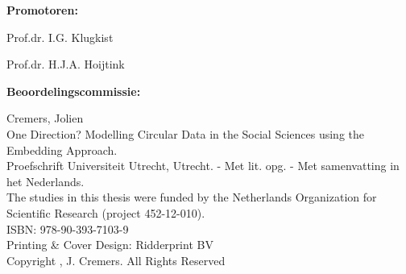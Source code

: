 \pagestyle{plain}
\textbf{Promotoren:}

Prof.dr. I.G. Klugkist

Prof.dr. H.J.A. Hoijtink

\newpage
\pagestyle{plain}
\textbf{Beoordelingscommissie:}



\vspace*{\fill}

Cremers, Jolien\\
One Direction? Modelling Circular Data in the Social Sciences using the Embedding Approach.\\
Proefschrift Universiteit Utrecht, Utrecht. - Met lit. opg. - Met samenvatting in het Nederlands.\\

The studies in this thesis were funded by the Netherlands Organization for Scientific Research (project 452-12-010).\\

ISBN: 978-90-393-7103-9\\
Printing \& Cover Design: Ridderprint BV\\
Copyright , J. Cremers. All Rights Reserved









